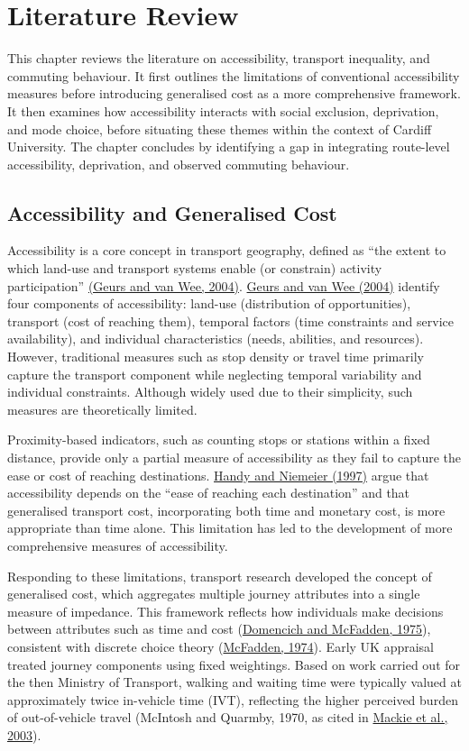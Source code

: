 \documentclass[11pt,a4paper]{article}
\newcommand{\hcite}[2]{\hyperlink{#1}{#2}}
\newcommand{\hcite}[2]{\hyperlink{#1}{#2}}
\begin{document}
\section{Literature Review}

This chapter reviews the literature on accessibility, transport inequality, and commuting behaviour. It first outlines the limitations of conventional accessibility measures before introducing generalised cost as a more comprehensive framework. It then examines how accessibility interacts with social exclusion, deprivation, and mode choice, before situating these themes within the context of Cardiff University. The chapter concludes by identifying a gap in integrating route-level accessibility, deprivation, and observed commuting behaviour.

\subsection{Accessibility and Generalised Cost}

Accessibility is a core concept in transport geography, defined as ``the extent to which land-use and transport systems enable (or constrain) activity participation'' \hcite{geurs2004}{(Geurs and van Wee, 2004)}. \hcite{geurs2004}{Geurs and van Wee (2004)} identify four components of accessibility: land-use (distribution of opportunities), transport (cost of reaching them), temporal factors (time constraints and service availability), and individual characteristics (needs, abilities, and resources). However, traditional measures such as stop density or travel time primarily capture the transport component while neglecting temporal variability and individual constraints. Although widely used due to their simplicity, such measures are theoretically limited.

Proximity-based indicators, such as counting stops or stations within a fixed distance, provide only a partial measure of accessibility as they fail to capture the ease or cost of reaching destinations. \hcite{handy1997}{Handy and Niemeier (1997)} argue that accessibility depends on the ``ease of reaching each destination'' and that generalised transport cost, incorporating both time and monetary cost, is more appropriate than time alone. This limitation has led to the development of more comprehensive measures of accessibility.

Responding to these limitations, transport research developed the concept of generalised cost, which aggregates multiple journey attributes into a single measure of impedance. This framework reflects how individuals make decisions between attributes such as time and cost (\hcite{domencich1975}{Domencich and McFadden, 1975}), consistent with discrete choice theory (\hcite{mcfadden1974}{McFadden, 1974}). Early UK appraisal treated journey components using fixed weightings. Based on work carried out for the then Ministry of Transport, walking and waiting time were typically valued at approximately twice in-vehicle time (IVT), reflecting the higher perceived burden of out-of-vehicle travel (McIntosh and Quarmby, 1970, as cited in \hcite{mackie2003}{Mackie et al., 2003}).
\end{document}
